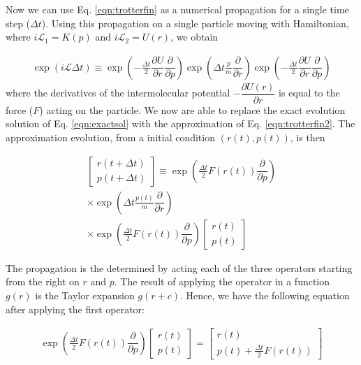Now we can use Eq. \ref{eqn:trotterfin} as a numerical propagation for a single time step ($\Delta t$). Using this propagation on a single particle moving with Hamiltonian, where $i\mathcal{L}_{1} = K (p)$ and $i\mathcal{L}_{2} = U (r)$, we obtain

\begin{equation}
\begin{aligned}
\exp (i\mathcal{L} \Delta t)  \equiv
\exp \left (-\frac{\Delta t}{2} \dfrac{\partial U}{\partial r} \dfrac{\partial}{\partial p} \right) \exp \left( \Delta t \frac{p}{m}\dfrac{\partial }{\partial r} \right)\exp \left (-\frac{\Delta t}{2} \dfrac{\partial U}{\partial r} \dfrac{\partial}{\partial p} \right) 
\end{aligned}
\label{eqn:trotterfin2}
\end{equation} 
where the derivatives of the intermolecular potential $-\dfrac{\partial U(r)}{\partial r}$ is equal to the force ($F$) acting on the particle. We now are able to replace the exact evolution solution of Eq. \ref{eqn:exactsol} with the approximation of Eq. \ref{eqn:trotterfin2}. The approximation evolution, from a initial condition $(r(t),p(t))$, is then

\begin{equation}
\begin{aligned}
\left[ \begin{array}{c} r(t+ \Delta t) \\ p(t + \Delta t) \end{array} \right] \equiv 
\exp \left (\frac{\Delta t}{2} F(r(t)) \dfrac{\partial}{\partial p} \right) \\
\times \exp \left( \Delta t \frac{p(t)}{m}\dfrac{\partial }{\partial r} \right) \\
\times \exp \left (\frac{\Delta t}{2} F(r(t)) \dfrac{\partial}{\partial p} \right)
 \left[ \begin{array}{c} r(t) \\ p(t) \end{array} \right]
\end{aligned}
\end{equation}

The propagation is the determined by acting each of the three operators starting from the right on $r$ and $p$. The result of applying the operator in a function $g(r)$ is the Taylor expansion $g(r+c)$. Hence, we have the following equation after applying the first operator:

\begin{equation}
\begin{aligned}
\exp \left (\frac{\Delta t}{2} F(r(t)) \dfrac{\partial}{\partial p} \right)
\left[ \begin{array}{c} r(t) \\ p(t) \end{array} \right] = 
\left[ \begin{array}{c} r(t) \\ p(t) + \frac{\Delta t}{2} F(r(t)) \end{array} \right]
\end{aligned}
\end{equation}

